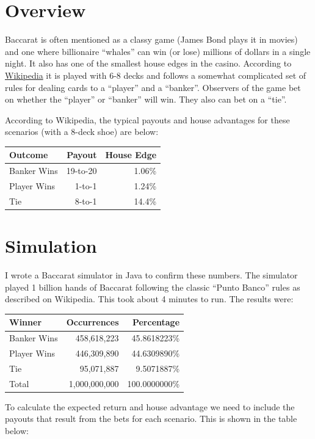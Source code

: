 \documentclass[
]{book}
\begin{document}
\hypertarget{overview}{%
\section{Overview}\label{overview}}

Baccarat is often mentioned as a classy game (James Bond plays it in movies) and one where billionaire ``whales'' can win (or lose) millions of dollars in a single night. It also has one of the smallest house edges in the casino. According to \href{https://en.wikipedia.org/wiki/Baccarat_(card_game)}{Wikipedia} it is played with 6-8 decks and follows a somewhat complicated set of rules for dealing cards to a ``player'' and a ``banker''. Observers of the game bet on whether the ``player'' or ``banker'' will win. They also can bet on a ``tie''.

According to Wikipedia, the typical payouts and house advantages for these scenarios (with a 8-deck shoe) are below:

\begin{longtable}[]{@{}lrr@{}}
\toprule
Outcome & Payout & House Edge\tabularnewline
\midrule
\endhead
Banker Wins & 19-to-20 & 1.06\%\tabularnewline
Player Wins & 1-to-1 & 1.24\%\tabularnewline
Tie & 8-to-1 & 14.4\%\tabularnewline
\bottomrule
\end{longtable}

\hypertarget{simulation}{%
\section{Simulation}\label{simulation}}

I wrote a Baccarat simulator in Java to confirm these numbers. The simulator played 1 billion hands of Baccarat following the classic ``Punto Banco'' rules as described on Wikipedia. This took about 4 minutes to run. The results were:

\begin{longtable}[]{@{}lrr@{}}
\toprule
Winner & Occurrences & Percentage\tabularnewline
\midrule
\endhead
Banker Wins & 458,618,223 & 45.8618223\%\tabularnewline
Player Wins & 446,309,890 & 44.6309890\%\tabularnewline
Tie & 95,071,887 & 9.5071887\%\tabularnewline
Total & 1,000,000,000 & 100.0000000\%\tabularnewline
\bottomrule
\end{longtable}

To calculate the expected return and house advantage we need to include the payouts that result from the bets for each scenario. This is shown in the table below:
\end{document}

